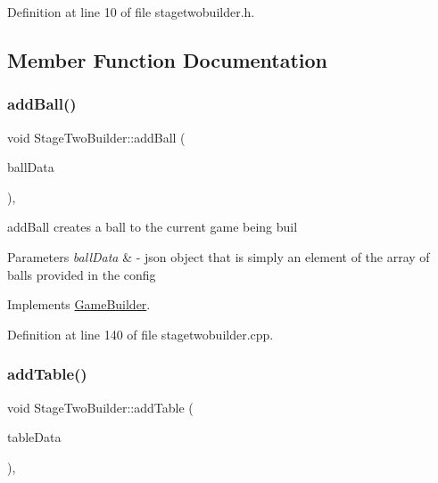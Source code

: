 Definition at line 10 of file stagetwobuilder.\+h.



\subsection{Member Function Documentation}
\mbox{\label{class_stage_two_builder_a8b2b783294c26b5f40d16bdd54d86301}} 
\subsubsection{\texorpdfstring{add\+Ball()}{addBall()}}
{\footnotesize\ttfamily void Stage\+Two\+Builder\+::add\+Ball (\begin{DoxyParamCaption}\item[{Q\+Json\+Object \&}]{ball\+Data }\end{DoxyParamCaption})\hspace{0.3cm}{\ttfamily [override]}, {\ttfamily [virtual]}}



add\+Ball creates a ball to the current game being buil 


\begin{DoxyParams}{Parameters}
{\em ball\+Data} & -\/ json object that is simply an element of the array of balls provided in the config \\
\hline
\end{DoxyParams}


Implements \mbox{\hyperlink{class_game_builder_a836186637bd2f7844f7dfac0135d833b}{Game\+Builder}}.



Definition at line 140 of file stagetwobuilder.\+cpp.

\mbox{\label{class_stage_two_builder_a7326ee514e752cab6d994352f5ef68e0}} 
\subsubsection{\texorpdfstring{add\+Table()}{addTable()}}
{\footnotesize\ttfamily void Stage\+Two\+Builder\+::add\+Table (\begin{DoxyParamCaption}\item[{Q\+Json\+Object \&}]{table\+Data }\end{DoxyParamCaption})\hspace{0.3cm}{\ttfamily [override]}, {\ttfamily [virtual]}}



